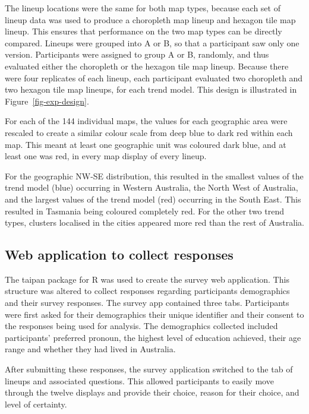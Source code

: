 \documentclass[
doublespace,
  times]{anzsauth}
\begin{document}
The lineup locations were the same for both map types, because each set
of lineup data was used to produce a choropleth map lineup and hexagon
tile map lineup. This ensures that performance on the two map types can
be directly compared. Lineups were grouped into A or B, so that a
participant saw only one version. Participants were assigned to group A
or B, randomly, and thus evaluated either the choropleth or the hexagon
tile map lineup. Because there were four replicates of each lineup, each
participant evaluated two choropleth and two hexagon tile map lineups,
for each trend model. This design is illustrated in
Figure~\ref{fig-exp-design}.

For each of the 144 individual maps, the values for each geographic area
were rescaled to create a similar colour scale from deep blue to dark
red within each map. This meant at least one geographic unit was
coloured dark blue, and at least one was red, in every map display of
every lineup.

For the geographic NW-SE distribution, this resulted in the smallest
values of the trend model (blue) occurring in Western Australia, the
North West of Australia, and the largest values of the trend model (red)
occurring in the South East. This resulted in Tasmania being coloured
completely red. For the other two trend types, clusters localised in the
cities appeared more red than the rest of Australia.

\subsection{Web application to collect
responses}\label{web-application-to-collect-responses}

The taipan \citep{taipan} package for R was used to create the survey
web application. This structure was altered to collect responses
regarding participants demographics and their survey responses. The
survey app contained three tabs. Participants were first asked for their
demographics their unique identifier and their consent to the responses
being used for analysis. The demographics collected included
participants' preferred pronoun, the highest level of education
achieved, their age range and whether they had lived in Australia.

After submitting these responses, the survey application switched to the
tab of lineups and associated questions. This allowed participants to
easily move through the twelve displays and provide their choice, reason
for their choice, and level of certainty.
\end{document}
